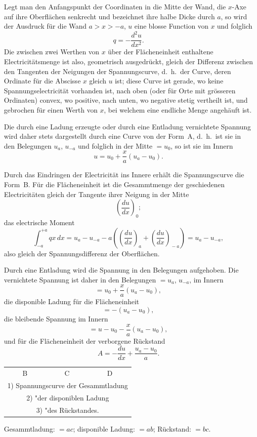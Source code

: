 \documentclass[12pt,a4paper]{article}
\begin{document}
Legt man den Anfangspunkt der Coordinaten in die Mitte der Wand, die $x$-Axe auf ihre Oberfl\"achen senkrecht und bezeichnet ihre halbe Dicke durch $a$, so wird der Ausdruck f\"ur die Wand $a > x > -a$, $u$ eine blosse Function von $x$ und folglich
\[
q = -\frac{d^2u}{dx^2}.
\]
Die zwischen zwei Werthen von $x$ \"uber der Fl\"acheneinheit enthaltene Electricit\"atsmenge ist also, geometrisch ausgedr\"uckt, gleich der Differenz zwischen den Tangenten der Neigungen der Spannungscurve, d.\ h.\ der Curve, deren Ordinate f\"ur die Abscisse $x$ gleich $u$ ist; diese Curve ist gerade, wo keine Spannungselectricit\"at vorhanden ist, nach oben (oder f\"ur Orte mit gr\"osseren Ordinaten) convex, wo positive, nach unten, wo negative stetig vertheilt ist, und gebrochen f\"ur einen Werth von $x$, bei welchem eine endliche Menge angeh\"auft ist.

Die durch eine Ladung erzeugte oder durch eine Entladung vernichtete Spannung wird daher stets dargestellt durch eine Curve von der Form~A, d.\ h.\ ist sie in den Belegungen $u_a$, $u_{-a}$ und folglich in der Mitte $=u_0$, so ist sie im Innern
\[
u = u_0 + \frac{x}{a}(u_a - u_0).
\]

Durch das Eindringen der Electricit\"at ins Innere erh\"alt die Spannungscurve die Form~B. F\"ur die Fl\"acheneinheit ist die Gesammtmenge der geschiedenen Electricit\"aten gleich der Tangente ihrer Neigung in der Mitte
\[
\left(\frac{du}{dx}\right)_{\!0};
\]
das electrische Moment
\[
\int_{-a}^{+a} qx\,dx = u_a - u_{-a} - a\left(\left(\frac{du}{dx}\right)_{\!a} + \left(\frac{du}{dx}\right)_{\!-a}\right) = u_a - u_{-a},
\]
also gleich der Spannungsdifferenz der Oberfl\"achen.

Durch eine Entladung wird die Spannung in den Belegungen aufgehoben. Die vernichtete Spannung ist daher in den Belegungen $=u_a$, $u_{-a}$, im Innern
\[
= u_0 + \frac{x}{a}(u_a - u_0),
\]
die disponible Ladung f\"ur die Fl\"acheneinheit
\[
= -(u_a - u_0),
\]
die bleibende Spannung im Innern
\[
= u - u_0 - \frac{x}{a}(u_a - u_0),
\]
und f\"ur die Fl\"acheneinheit der verborgene R\"uckstand
\[
A = -\frac{du}{dx} + \frac{u_a - u_0}{a}.
\]

\begin{center}
\begin{tabular}{ccc}
B & C & D \\
\multicolumn{3}{c}{1) Spannungscurve der Gesammtladung} \\
\multicolumn{3}{c}{2) \quad"\quad\quad der disponiblen Ladung} \\
\multicolumn{3}{c}{3) \quad"\quad\quad des R\"uckstandes.} \\
\end{tabular}
\end{center}
Gesammtladung: $=ac$; disponible Ladung: $=ab$; R\"uckstand: $=bc$.
\end{document}
